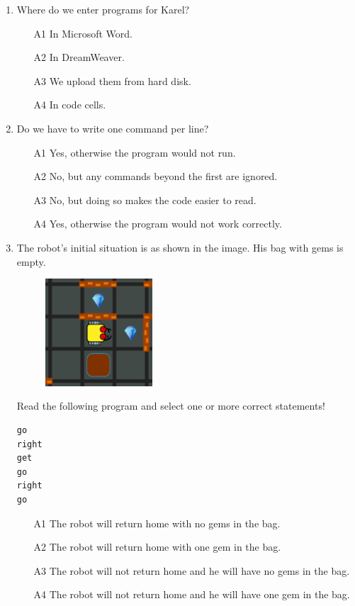 \documentclass[article,A4,12pt]{llncs}
\begin{document}
\begin{enumerate}
\item Where do we enter programs for Karel?
\begin{enumerate}
\item[A1] In Microsoft Word.
\item[A2] In DreamWeaver.
\item[A3] We upload them from hard disk.
\item[A4] In code cells.
\end{enumerate}
\item Do we have to write one command per line?
\begin{enumerate}
\item[A1] Yes, otherwise the program would not run.
\item[A2] No, but any commands beyond the first are ignored.
\item[A3] No, but doing so makes the code easier to read.
\item[A4] Yes, otherwise the program would not work correctly.
\end{enumerate}
\item The robot's initial situation is as shown in the image. His bag with gems is empty.
\begin{figure}[!ht]
\begin{center}
\includegraphics[width=4cm]{imgk/maze-0.png}
\end{center}
\end{figure}
\noindent
Read the following program and select one or more correct statements!
\begin{verbatim}
go
right
get
go
right 
go
\end{verbatim}
\begin{enumerate}
\item[A1] The robot will return home with no gems in the bag.
\item[A2] The robot will return home with one gem in the bag.
\item[A3] The robot will not return home and he will have no gems in the bag.
\item[A4] The robot will not return home and he will have one gem in the bag.

\end{enumerate}
\end{enumerate}
\end{document}
